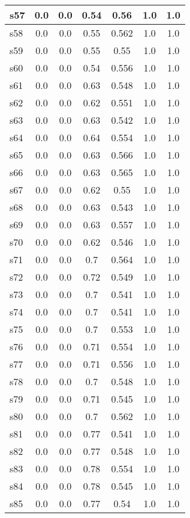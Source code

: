 \documentclass{article}
\begin{document}
\begin{tabular}{|l|c|c|c|c|c|c|}
\hline
s57 &0.0 & 0.0 & 0.54 & 0.56 & 1.0 & 1.0\\
\hline
s58 &0.0 & 0.0 & 0.55 & 0.562 & 1.0 & 1.0\\
\hline
s59 &0.0 & 0.0 & 0.55 & 0.55 & 1.0 & 1.0\\
\hline
s60 &0.0 & 0.0 & 0.54 & 0.556 & 1.0 & 1.0\\
\hline
s61 &0.0 & 0.0 & 0.63 & 0.548 & 1.0 & 1.0\\
\hline
s62 &0.0 & 0.0 & 0.62 & 0.551 & 1.0 & 1.0\\
\hline
s63 &0.0 & 0.0 & 0.63 & 0.542 & 1.0 & 1.0\\
\hline
s64 &0.0 & 0.0 & 0.64 & 0.554 & 1.0 & 1.0\\
\hline
s65 &0.0 & 0.0 & 0.63 & 0.566 & 1.0 & 1.0\\
\hline
s66 &0.0 & 0.0 & 0.63 & 0.565 & 1.0 & 1.0\\
\hline
s67 &0.0 & 0.0 & 0.62 & 0.55 & 1.0 & 1.0\\
\hline
s68 &0.0 & 0.0 & 0.63 & 0.543 & 1.0 & 1.0\\
\hline
s69 &0.0 & 0.0 & 0.63 & 0.557 & 1.0 & 1.0\\
\hline
s70 &0.0 & 0.0 & 0.62 & 0.546 & 1.0 & 1.0\\
\hline
s71 &0.0 & 0.0 & 0.7 & 0.564 & 1.0 & 1.0\\
\hline
s72 &0.0 & 0.0 & 0.72 & 0.549 & 1.0 & 1.0\\
\hline
s73 &0.0 & 0.0 & 0.7 & 0.541 & 1.0 & 1.0\\
\hline
s74 &0.0 & 0.0 & 0.7 & 0.541 & 1.0 & 1.0\\
\hline
s75 &0.0 & 0.0 & 0.7 & 0.553 & 1.0 & 1.0\\
\hline
s76 &0.0 & 0.0 & 0.71 & 0.554 & 1.0 & 1.0\\
\hline
s77 &0.0 & 0.0 & 0.71 & 0.556 & 1.0 & 1.0\\
\hline
s78 &0.0 & 0.0 & 0.7 & 0.548 & 1.0 & 1.0\\
\hline
s79 &0.0 & 0.0 & 0.71 & 0.545 & 1.0 & 1.0\\
\hline
s80 &0.0 & 0.0 & 0.7 & 0.562 & 1.0 & 1.0\\
\hline
s81 &0.0 & 0.0 & 0.77 & 0.541 & 1.0 & 1.0\\
\hline
s82 &0.0 & 0.0 & 0.77 & 0.548 & 1.0 & 1.0\\
\hline
s83 &0.0 & 0.0 & 0.78 & 0.554 & 1.0 & 1.0\\
\hline
s84 &0.0 & 0.0 & 0.78 & 0.545 & 1.0 & 1.0\\
\hline
s85 &0.0 & 0.0 & 0.77 & 0.54 & 1.0 & 1.0\\

\end{tabular}
\end{document}
